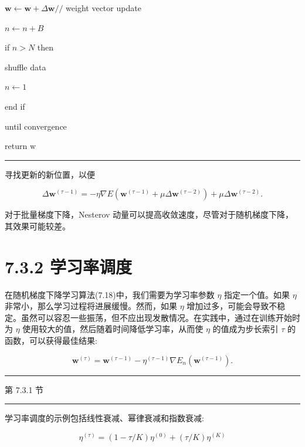 \documentclass[10pt]{report}
\newcommand{\HRule}{\begin{center}\rule{0.9\linewidth}{0.2mm}\end{center}}
\begin{document}
\hspace*{1em} \(\mathbf{w} \leftarrow  \mathbf{w} + \Delta \mathbf{w}//\) weight vector update

\hspace*{1em} \(n \leftarrow  n + B\)

\hspace*{1em} if \(n > N\) then

\hspace*{2em} shuffle data

\hspace*{2em} \(n \leftarrow  1\)

\hspace*{1em} end if

until convergence

return \(\mathrm{w}\)

\HRule

寻找更新的新位置，以便

\[
\Delta {\mathbf{w}}^{\left( \tau  - 1\right) } =  - \eta \nabla E\left( {{\mathbf{w}}^{\left( \tau  - 1\right) } + {\mu \Delta }{\mathbf{w}}^{\left( \tau  - 2\right) }}\right)  + {\mu \Delta }{\mathbf{w}}^{\left( \tau  - 2\right) }. \tag{7.34}
\]

对于批量梯度下降，Nesterov 动量可以提高收敛速度，尽管对于随机梯度下降，其效果可能较差。

\section*{7.3.2 学习率调度}

在随机梯度下降学习算法(7.18)中，我们需要为学习率参数 \(\eta\) 指定一个值。如果 \(\eta\) 非常小，那么学习过程将进展缓慢。然而，如果 \(\eta\) 增加过多，可能会导致不稳定。虽然可以容忍一些振荡，但不应出现发散情况。在实践中，通过在训练开始时为 \(\eta\) 使用较大的值，然后随着时间降低学习率，从而使 \(\eta\) 的值成为步长索引 \(\tau\) 的函数，可以获得最佳结果:

\[
{\mathbf{w}}^{\left( \tau \right) } = {\mathbf{w}}^{\left( \tau  - 1\right) } - {\eta }^{\left( \tau  - 1\right) }\nabla {E}_{n}\left( {\mathbf{w}}^{\left( \tau  - 1\right) }\right) . \tag{7.35}
\]

\HRule

第 7.3.1 节

\HRule

学习率调度的示例包括线性衰减、幂律衰减和指数衰减:

\[
{\eta }^{\left( \tau \right) } = \left( {1 - \tau /K}\right) {\eta }^{\left( 0\right) } + \left( {\tau /K}\right) {\eta }^{\left( K\right) } \tag{7.36}
\]
\end{document}

